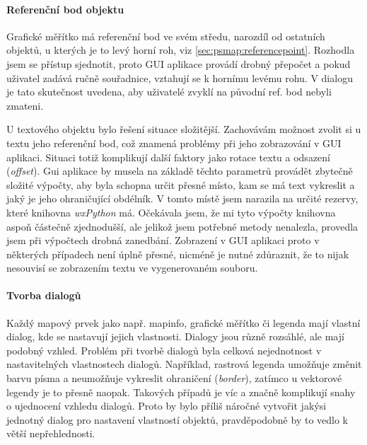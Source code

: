 \documentclass[a4paper,12pt,draft]{article}
\begin{document}
 \paragraph*{Referenční bod objektu}
 Grafické měřítko má referenční bod ve svém středu, narozdíl
 od ostatních objektů, u kterých je to levý horní roh, viz
 \ref{sec:psmap:referencepoint}. Rozhodla jsem se přístup sjednotit,
 proto GUI aplikace provádí drobný přepočet a pokud uživatel zadává
 ručně souřadnice, vztahují se k hornímu levému rohu. V dialogu je
 tato skutečnost uvedena, aby uživatelé zvyklí na původní ref. bod
 nebyli zmateni.

 U textového objektu bylo řešení situace složitější. Zachovávám
 možnost zvolit si u textu jeho referenční bod, což znamená problémy
 při jeho zobrazování v GUI aplikaci. Situaci totiž komplikují další
 faktory jako rotace textu a odsazení (\emph{offset}).
 Gui aplikace by musela na základě těchto parametrů provádět zbytečně
 složité výpočty, aby byla schopna určit přesné místo, kam se
 má text vykreslit a jaký je jeho ohraničující obdélník. V tomto
 místě jsem narazila na určité rezervy, které knihovna \emph{wxPython}
 má. Očekávala jsem, že mi tyto výpočty knihovna aspoň částečně
 zjednodušší, ale jelikož jsem potřebné metody nenalezla, provedla
 jsem při výpočtech drobná zanedbání. Zobrazení v GUI aplikaci proto
 v některých případech není úplně přesné, nicméně je nutné
 zdůraznit, že to nijak nesouvisí se zobrazením textu ve  vygenerovaném
 souboru.

 \paragraph*{Tvorba dialogů}
 Každý mapový prvek jako např. mapinfo, grafické měřítko či legenda
 mají vlastní dialog, kde se nastavují jejich vlastnosti. Dialogy jsou
 různě rozsáhlé, ale mají podobný vzhled. Problém při tvorbě
 dialogů byla celková nejednotnost v nastavitelných vlastnostech
 dialogů. Například, rastrová legenda umožňuje změnit barvu písma a
 neumožňuje vykreslit ohraničení (\emph{border}), zatímco u vektorové
 legendy je to přesně naopak. Takových případů je víc a značně
 komplikují snahy o ujednocení vzhledu dialogů. Proto by bylo příliš
 náročné vytvořit jakýsi jednotný dialog pro nastavení vlastností
 objektů, pravděpodobně by to vedlo k větší nepřehlednosti.
\end{document}
